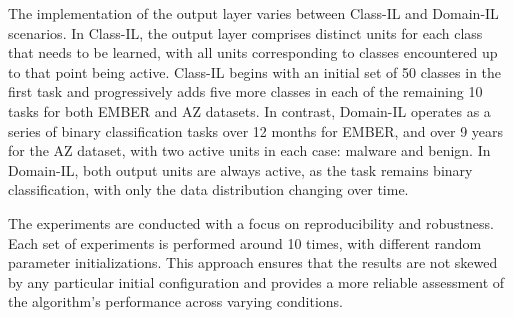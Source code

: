 The implementation of the output layer varies between Class-IL and Domain-IL scenarios. In Class-IL, the output layer comprises distinct units for each class that needs to be learned, with all units corresponding to classes encountered up to that point being active. Class-IL begins with an initial set of 50 classes in the first task and progressively adds five more classes in each of the remaining 10 tasks for both EMBER and AZ datasets. In contrast, Domain-IL operates as a series of binary classification tasks over 12 months for EMBER, and over 9 years for the AZ dataset, with two active units in each case: malware and benign. In Domain-IL, both output units are always active, as the task remains binary classification, with only the data distribution changing over time.


The experiments are conducted with a focus on reproducibility and robustness. Each set of experiments is performed around 10 times, with different random parameter initializations. This approach ensures that the results are not skewed by any particular initial configuration and provides a more reliable assessment of the algorithm's performance across varying conditions.

\fi

